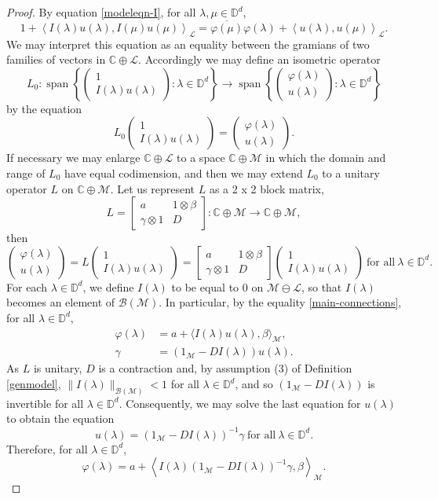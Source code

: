 \documentclass[11pt, reqno]{amsart}
\DeclareMathOperator{\spa}{span}
\newcommand\1{\boldsymbol {1}}
\newcommand\lam{\lambda}
\renewcommand{\L}{\mathcal{L}}
\newcommand{\M}{\mathcal{M}}
\newcommand{\D}{\mathbb{D}}
\newcommand{\C}{\mathbb{C}}
\newcommand{\ip}[2]{\left\langle #1, #2 \right\rangle}
\newcommand{\vp}{\varphi}
\newcommand{\ph}{\varphi}
\newcommand\ga{\gamma}
\newcommand\la{\lambda}
\newcommand\beq{\begin{equation}}
\newcommand\eeq{\end{equation}}
\newcommand{\vectwo}[2]
{
   \begin{pmatrix} #1 \\ #2 \end{pmatrix}
}
\numberwithin{equation}{section}
\begin{document}
\begin{proof}
By equation \eqref{modeleqn-I}, for all $\la,\mu\in\D^d$,
\[
1+\ip{I(\la)u(\la)}{I(\mu)u(\mu)}_{\L} = \overline{\ph(\mu)}\ph(\la) + \ip{u(\la)}{u(\mu)}_{\L}.
\]
We may interpret this equation as an equality between the gramians of two families of vectors in $\C\oplus\L$.
Accordingly we may define an isometric operator
\[
L_0: \spa \left\{ \vectwo{1}{I(\lambda)u(\lambda)} : \la\in\D^d\right\}\to \spa\left\{ \vectwo{\vp(\lambda)}{u(\lambda)}: \la\in\D^d \right\}
\]
by the equation 
\beq
 L_0 \vectwo{1}{I(\lambda)u(\lambda)} = \vectwo{\vp(\lambda)}{u(\lambda)}.
\eeq
 If necessary we may enlarge $\C\oplus\L$ to a space $\C\oplus\M$ in which the domain and range of $L_0$ have equal codimension, and then we may extend $L_0$ to a unitary operator $L$ on $\C\oplus\M$.
Let us represent $L$ as a 2 x 2 block matrix, 
\[
L =  \begin{bmatrix}
  a & 1 \otimes \beta \\
  \gamma \otimes 1 & D
 \end{bmatrix}: \C \oplus \M \to \C \oplus \M,
\]
then
\beq \label{main-connections}
\vectwo{\vp(\lambda)}{u(\lambda)} = L \vectwo{1}{I(\lambda)u(\lambda)} = \begin{bmatrix}
  a & 1 \otimes \beta \\
  \gamma \otimes 1 & D
 \end{bmatrix}\vectwo{1}{I(\lambda)u(\lambda)} \ \text{for all} \ \la\in\D^d.
\eeq
For each $\lambda\in\mathbb{D}^{d}$,  we define $I(\lambda)$ to be equal to $0$ on $\M \ominus \L$, so that $I(\lam)$ becomes an element of $\mathcal{B}(\M)$.
In particular, by the equality \eqref{main-connections}, for all $\lambda\in\mathbb{D}^{d}$,
\begin{align}
    \varphi(\lambda)&=a+\langle I(\lambda) u(\lambda),\beta\rangle_{\mathcal{M}},\\
    \gamma &=(1_{\mathcal{M}}-D I(\lambda)) u(\lambda). 
\end{align}
As $L$ is unitary, $D$ is a contraction and, by assumption (3) of Definition \ref{genmodel}, $\|I(\lambda)\|_{\mathcal{B(\M)}}<1$ for all $\lambda\in\mathbb{D}^{d}$, and so $(1_{\M} -DI(\la))$ is invertible for all $\lambda\in\mathbb{D}^{d}$.
Consequently, we may solve the last equation for $u(\lambda)$ to obtain the equation 
\[
u(\lambda)= (1_{\M} -DI(\la))^{-1}\gamma \ \text{for all} \ \la\in\D^d.
\]
Therefore, for all $\la\in\D^d$,
\beq\label{formphi-2}
\ph(\la) = a+ \ip{I(\la)(1_{\M}-DI(\la))^{-1}\ga}{\beta}_{\M}.
\eeq
\end{proof}
\end{document}
